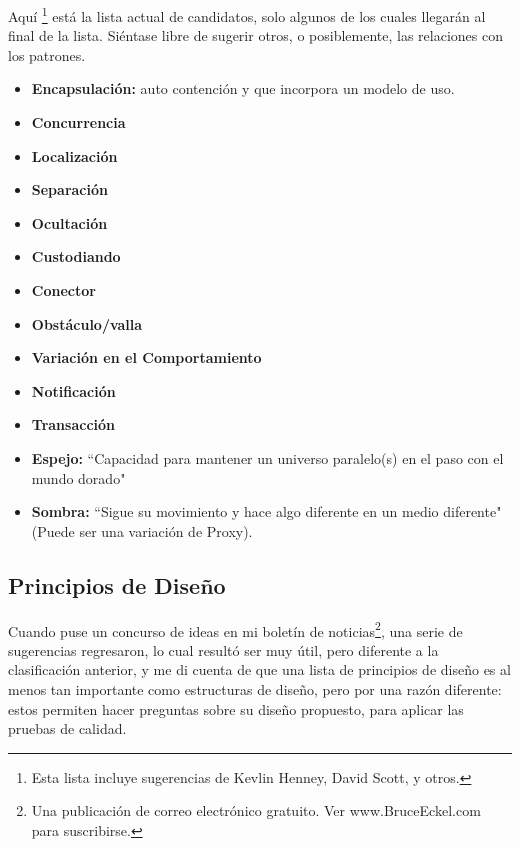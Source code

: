 Aquí \footnote{Esta lista incluye sugerencias de Kevlin Henney, David Scott, y otros.} está la lista actual de candidatos, solo algunos de los cuales llegarán al final de la lista. Siéntase libre de sugerir otros, o posiblemente, las relaciones con los patrones. \newline

\begin{itemize} %
    \item \textbf{Encapsulación:} auto contención y que incorpora un modelo de uso.
    \item \textbf{Concurrencia} %
    \item \textbf{Localización}
    \item \textbf{Separación}  %
    \item \textbf{Ocultación}
    \item \textbf{Custodiando}
    \item \textbf{Conector}
    \item \textbf{Obstáculo/valla}
    \item \textbf{Variación en el Comportamiento}
    \item \textbf{Notificación}
    \item \textbf{Transacción}
    \item \textbf{Espejo: }``Capacidad para mantener un universo paralelo(s) en el paso con el mundo dorado"
    \item \textbf{Sombra:} ``Sigue su movimiento y hace algo diferente en un medio diferente" (Puede ser una variación de Proxy).
\end{itemize}

\subsection*{Principios de Diseño}
\label{subsec:cdd}

Cuando puse un concurso de ideas en mi boletín de noticias\footnote{Una publicación de correo electrónico gratuito. Ver www.BruceEckel.com para suscribirse.}, una serie de sugerencias regresaron, lo cual resultó ser muy útil, pero diferente a la clasificación anterior, y me di cuenta de que una lista de principios de diseño es al menos tan importante como estructuras de diseño, pero por una razón diferente: estos permiten hacer preguntas sobre su diseño propuesto, para aplicar las pruebas de calidad.   \newline

